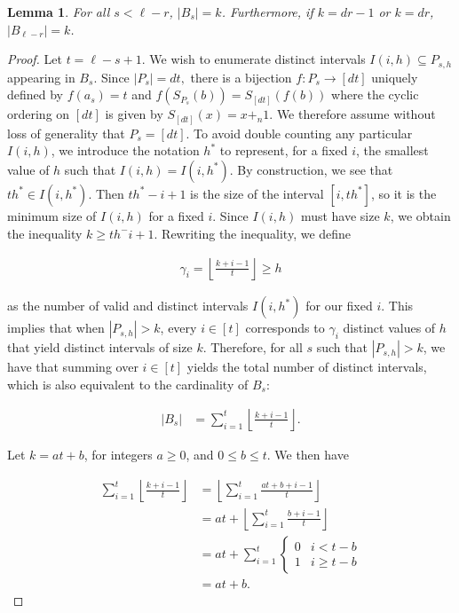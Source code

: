\documentclass[11pt]{amsart}
\theoremstyle{plain}
\newtheorem{lemma}[theorem]{Lemma}
\theoremstyle{definition}
\begin{document}
\begin{lemma}\label{lemma: SizeBsSmalls}
 For all $s < \ell-r$, $|B_s|=k$. Furthermore, if $k=dr-1$ or $k=dr$, $|B_{\ell-r}|=k$.
 \end{lemma}
\begin{proof}
Let $t=\ell-s+1$. We wish to enumerate distinct intervals $I(i,h) \subseteq P_{s,h}$ appearing in $B_s$. Since $|P_s|=dt,$ there is a bijection $f:P_s\to [dt]$ uniquely defined by $f(a_s)=t$ and $f(S_{P_s}(b))=S_{[dt]}(f(b))$ where the cyclic ordering on $[dt]$ is given by $S_{[dt]}(x)=x+_n 1$. We therefore assume without loss of generality that $P_s=[dt]$. To avoid double counting any particular $I(i, h)$, we introduce the notation $h^*$ to represent, for a fixed $i$, the smallest value of $h$ such that $I(i,h) = I(i, h^*)$. By construction, we see that $th^* \in I(i,h^*)$. Then $th^*-i+1$ is the size of the interval $[i, th^*]$, so it is the minimum size of $I(i, h)$ for a fixed $i$. Since $I(i,h)$ must have size $k$, we obtain the inequality $k \geq th^-i+1$. Rewriting the inequality, we define  

\begin{align*}
    \gamma_i= \left \lfloor \frac{k+i-1}{t} \right \rfloor  \geq h
\end{align*}

as the number of valid and distinct intervals $I(i, h^*)$ for our fixed $i$. This implies that when $|P_{s,h}|> k$, every $i \in [t]$ corresponds to $\gamma_i$ distinct values of $h$ that yield distinct intervals of size $k$. Therefore, for all $s$  such that $|P_{s,h}|>k$, we have that summing over $i \in [t]$ yields the total number of distinct intervals, which is also equivalent to the cardinality of $B_s$:

\begin{align*}
    |B_s| &= \sum_{i=1}^t \left \lfloor \frac{k+i-1}{t} \right \rfloor.  
\end{align*}


Let $k=at+b$, for integers $a \geq 0$, and $0 \leq b \leq t$. We then have

\begin{align*}
     \sum_{i=1}^t \left \lfloor\frac{k+i-1}{t} \right \rfloor 
   & = \left \lfloor  \sum_{i=1}^t \frac{at + b + i-1}{t} \right \rfloor \\
   &= at +  \left \lfloor  \sum_{i=1}^t \frac{b+i-1}{t} \right \rfloor \\
   &= at +\sum_{i=1}^t
    \begin{cases}
        0 & i < t-b\\
        1 & i \geq t-b
    \end{cases} \\
    &= at +b.
\end{align*}


\end{proof}
\end{document}
